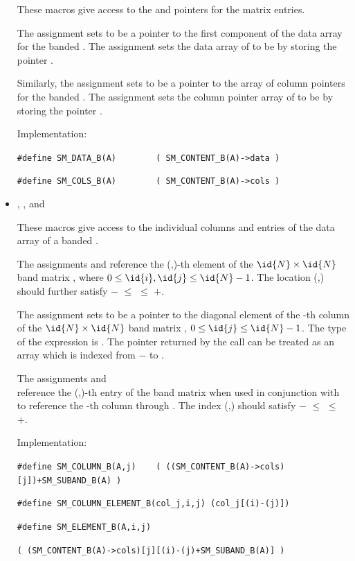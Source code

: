 \begin{itemize}
  These macros give access to the  and  pointers for
  the matrix entries.

  The assignment  sets  to be
  a pointer to the first component of the data array for the
  banded  .  The assignment  sets the data array of  to be  by storing
  the pointer .

  Similarly, the assignment  sets  to be
  a pointer to the array of column pointers for the banded  .
  The assignment  sets the column pointer
  array of  to be  by storing the pointer .

  Implementation:

  \verb|#define SM_DATA_B(A)        ( SM_CONTENT_B(A)->data )|

  \verb|#define SM_COLS_B(A)        ( SM_CONTENT_B(A)->cols )|


\item {}, , and 

  These macros give access to the individual columns and entries of
  the data array of a banded .

  The assignments  and  reference the (,)-th element of the
  $\id{N} \times \id{N}$ band matrix , where $0 \le \id{i}, \id{j} \le \id{N}-1$.
  The location (,) should further satisfy
  $-$ $\le$  $\le$ $+$.

  The assignment  sets  to be
  a pointer to the diagonal element of the -th column of the
  $\id{N} \times \id{N}$ band matrix , $0 \le \id{j} \le \id{N}-1$.
  The type of the expression  is .
  The pointer returned by the call  can be treated as
  an array which is indexed from $-$ to .

  The assignments  and\\
   reference the
  (,)-th entry of the band matrix  when used in
  conjunction with  to reference the -th column
  through . The index (,) should satisfy
  $-$ $\le$  $\le$ $+$.

  Implementation:

  \verb|#define SM_COLUMN_B(A,j)    ( ((SM_CONTENT_B(A)->cols)[j])+SM_SUBAND_B(A) )|

  \verb|#define SM_COLUMN_ELEMENT_B(col_j,i,j) (col_j[(i)-(j)])|

  \verb|#define SM_ELEMENT_B(A,i,j)|

  \hspace{1in} \verb|( (SM_CONTENT_B(A)->cols)[j][(i)-(j)+SM_SUBAND_B(A)] )|

\end{itemize}
